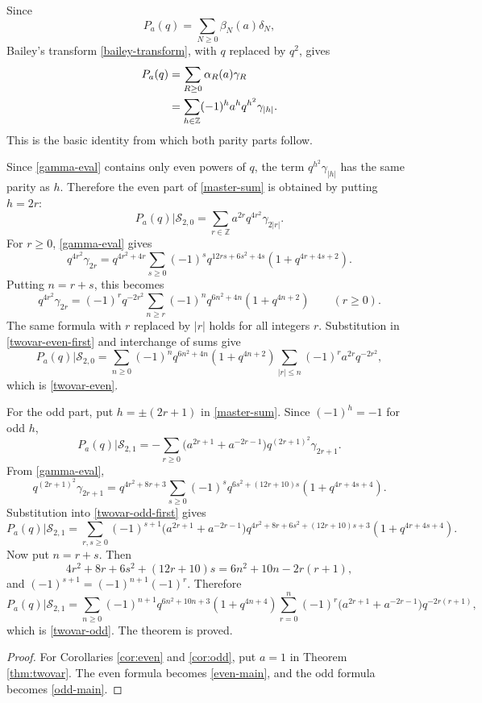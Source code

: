 \documentclass[11pt]{amsart}
\theoremstyle{remark}
\newcommand{\Z}{\mathbb Z}
\newcommand{\sieve}[2]{\mathcal S_{#1,#2}}
\begin{document}
Since
\[
P_a(q)=\sum_{N\ge0}\beta_N(a)\delta_N,
\]
Bailey's transform \eqref{bailey-transform}, with $q$ replaced by $q^2$, gives
\begin{align}
P_a(q)
&=\sum_{R\ge0}\alpha_R(a)\gamma_R \notag\\
&=\sum_{h\in\Z}(-1)^h a^h q^{h^2}\gamma_{|h|}. \label{master-sum}
\end{align}
This is the basic identity from which both parity parts follow.

Since \eqref{gamma-eval} contains only even powers of $q$, the term $q^{h^2}\gamma_{|h|}$ has the same parity as $h$.  Therefore the even part of \eqref{master-sum} is obtained by putting $h=2r$:
\begin{equation}\label{twovar-even-first}
P_a(q)\big|\sieve{2}{0}
=
\sum_{r\in\Z}a^{2r}q^{4r^2}\gamma_{2|r|}.
\end{equation}
For $r\ge0$, \eqref{gamma-eval} gives
\[
q^{4r^2}\gamma_{2r}
=
q^{4r^2+4r}
\sum_{s\ge0}(-1)^sq^{12rs+6s^2+4s}(1+q^{4r+4s+2}).
\]
Putting $n=r+s$, this becomes
\begin{equation}\label{Er-tail}
q^{4r^2}\gamma_{2r}
=
(-1)^rq^{-2r^2}
\sum_{n\ge r}(-1)^nq^{6n^2+4n}(1+q^{4n+2})
\qquad(r\ge0).
\end{equation}
The same formula with $r$ replaced by $|r|$ holds for all integers $r$.  Substitution in \eqref{twovar-even-first} and interchange of sums give
\[
P_a(q)\big|\sieve{2}{0}
=
\sum_{n\ge0}(-1)^nq^{6n^2+4n}(1+q^{4n+2})
\sum_{|r|\le n}(-1)^r a^{2r}q^{-2r^2},
\]
which is \eqref{twovar-even}.

For the odd part, put $h=\pm(2r+1)$ in \eqref{master-sum}.  Since $(-1)^h=-1$ for odd $h$,
\begin{equation}\label{twovar-odd-first}
P_a(q)\big|\sieve{2}{1}
=
-\sum_{r\ge0}\big(a^{2r+1}+a^{-2r-1}\big)
q^{(2r+1)^2}\gamma_{2r+1}.
\end{equation}
From \eqref{gamma-eval},
\[
q^{(2r+1)^2}\gamma_{2r+1}
=
q^{4r^2+8r+3}
\sum_{s\ge0}(-1)^sq^{6s^2+(12r+10)s}
(1+q^{4r+4s+4}).
\]
Substitution into \eqref{twovar-odd-first} gives
\[
P_a(q)\big|\sieve{2}{1}
=
\sum_{r,s\ge0}(-1)^{s+1}
\big(a^{2r+1}+a^{-2r-1}\big)
q^{4r^2+8r+6s^2+(12r+10)s+3}
(1+q^{4r+4s+4}).
\]
Now put $n=r+s$.  Then
\[
4r^2+8r+6s^2+(12r+10)s
=
6n^2+10n-2r(r+1),
\]
and $(-1)^{s+1}=(-1)^{n+1}(-1)^r$.  Therefore
\[
P_a(q)\big|\sieve{2}{1}
=
\sum_{n\ge0}(-1)^{n+1}q^{6n^2+10n+3}(1+q^{4n+4})
\sum_{r=0}^{n}(-1)^r
\big(a^{2r+1}+a^{-2r-1}\big)q^{-2r(r+1)},
\]
which is \eqref{twovar-odd}.  The theorem is proved.

\begin{proof}
For Corollaries \ref{cor:even} and \ref{cor:odd}, put $a=1$ in Theorem \ref{thm:twovar}.  The even formula becomes \eqref{even-main}, and the odd formula becomes \eqref{odd-main}.
\end{proof}
\end{document}
